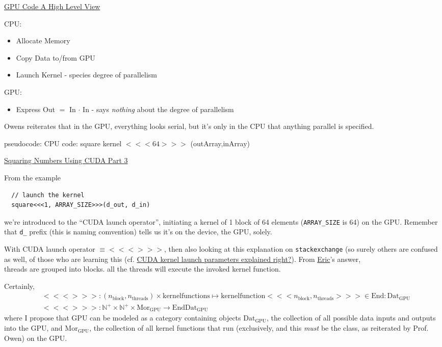 \documentclass[10pt]{amsart}
\begin{document}
\begin{multicols*}{2}
\href{https://classroom.udacity.com/courses/cs344/lessons/55120467/concepts/670742870923}{GPU Code A High Level View}

CPU:
\begin{itemize}
  \item Allocate Memory 
  \item Copy Data to/from GPU
    \item Launch Kernel - species degree of parallelism
\end{itemize}

GPU:
\begin{itemize}
\item Express Out $=$ In $\cdot $ In  - says \emph{nothing} about the degree of parallelism
  \end{itemize}

Owens reiterates that in the GPU, everything looks serial, but it's only in the CPU that anything parallel is specified.  

pseudocode: CPU code: square kernel $<<< 64 >>>$ (outArray,inArray)

\href{https://classroom.udacity.com/courses/cs344/lessons/55120467/concepts/670742940923}{Squaring Numbers Using CUDA Part 3}

From the example
\begin{lstlisting}
  // launch the kernel
  square<<<1, ARRAY_SIZE>>>(d_out, d_in)
  \end{lstlisting}
we're introduced to the ``CUDA launch operator'', initiating a kernel of 1 block of 64 elements (\verb|ARRAY_SIZE| is 64) on the GPU.  Remember that \verb|d_| prefix (this is naming comvention) tells us it's on the device, the GPU, solely.  

With CUDA launch operator $\equiv <<<>>>$, then also looking at this explanation on \verb|stackexchange| (so surely others are confused as well, of those who are learning this (cf. \href{http://stackoverflow.com/questions/19240658/cuda-kernel-launch-parameters-explained-right}{CUDA kernel launch parameters explained right?}).  From \href{http://stackoverflow.com/users/1957265/eric}{Eric}'s answer, \\

threads are grouped into blocks.  all the threads will execute the invoked kernel function.

Certainly,
\[
\begin{aligned}
  & <<<>>>:(n_{\text{block}}, n_{\text{threads}})\times \text{kernelfunctions} \mapsto \text{kernelfunction}<<<n_{\text{block}},n_{\text{threads}}>>> \in \text{End}:\text{Dat}_{\text{GPU}} \\ 
  & <<<>>>: \mathbb{N}^+ \times \mathbb{N}^+ \times \text{Mor}_{\text{GPU}} \to \text{End}\text{Dat}_{\text{GPU}}
  \end{aligned}
\]
where I propose that GPU can be modeled as a category containing objects $\text{Dat}_{\text{GPU}}$, the collection of all possible data inputs and outputs into the GPU, and $\text{Mor}_{\text{GPU}}$, the collection of all kernel functions that run (exclusively, and this \emph{must} be the class, as reiterated by Prof. Owen) on the GPU.


\end{multicols*}
\end{document}
